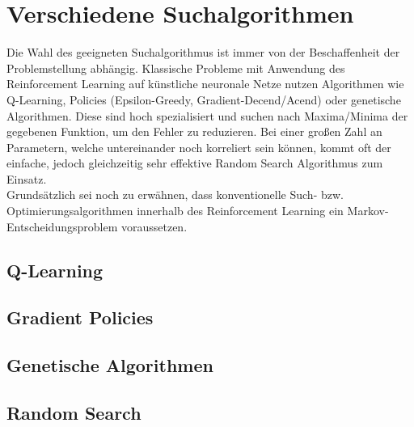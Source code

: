 \section{Verschiedene Suchalgorithmen}
\label{sec:rl_alt}
	Die Wahl des geeigneten Suchalgorithmus ist immer von der Beschaffenheit der Problemstellung abhängig. Klassische Probleme mit Anwendung des Reinforcement Learning auf künstliche neuronale Netze nutzen Algorithmen wie Q-Learning, Policies (Epsilon-Greedy, Gradient-Decend/Acend) oder genetische Algorithmen. Diese sind hoch spezialisiert und suchen nach Maxima/Minima der gegebenen Funktion, um den Fehler zu reduzieren. Bei einer großen Zahl an Parametern, welche untereinander noch korreliert sein können, kommt oft der einfache, jedoch gleichzeitig sehr effektive Random Search Algorithmus zum Einsatz.\\
	Grundsätzlich sei noch zu erwähnen, dass konventionelle Such- bzw. Optimierungsalgorithmen innerhalb des Reinforcement Learning ein Markov-Entscheidungsproblem voraussetzen. 
	\subsection{Q-Learning}
		
	\subsection{Gradient Policies}
	\subsection{Genetische Algorithmen}
	\subsection{Random Search}
	
